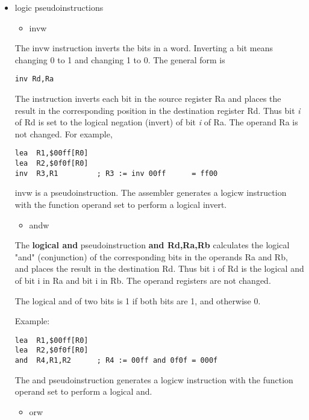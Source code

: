 \documentclass[11pt]{article}
\begin{document}
\begin{itemize}
\item logic pseudoinstructions
\label{sec:org8b8da8e}
\begin{itemize}
\item invw
\end{itemize}

The invw instruction inverts the bits in a word.  Inverting a bit
means changing 0 to 1 and changing 1 to 0.  The general form is

\begin{verbatim}
inv Rd,Ra
\end{verbatim}

The instruction inverts each bit in the source register Ra and places
the result in the corresponding position in the destination register
Rd.  Thus bit \emph{i} of Rd is set to the logical negation (invert) of bit
\emph{i} of Ra.  The operand Ra is not changed.  For example,

\begin{verbatim}
lea  R1,$00ff[R0]
lea  R2,$0f0f[R0]
inv  R3,R1         ; R3 := inv 00ff      = ff00
\end{verbatim}

invw is a pseudoinstruction.  The assembler generates a logicw
instruction with the function operand set to perform a logical invert.

\begin{itemize}
\item andw
\end{itemize}

The \textbf{\textbf{logical and}} pseudoinstruction \textbf{and Rd,Ra,Rb} calculates the
logical "and" (conjunction) of the corresponding bits in the operands
Ra and Rb, and places the result in the destination Rd.  Thus bit i of
Rd is the logical and of bit i in Ra and bit i in Rb.  The operand
registers are not changed.

The logical and of two bits is 1 if both bits are 1, and otherwise 0.

Example:
\begin{verbatim}
lea  R1,$00ff[R0]
lea  R2,$0f0f[R0]
and  R4,R1,R2      ; R4 := 00ff and 0f0f = 000f
\end{verbatim}

The and pseudoinstruction generates a logicw instruction with the
function operand set to perform a logical and.

\begin{itemize}
\item orw
\end{itemize}


\end{itemize}
\end{document}
